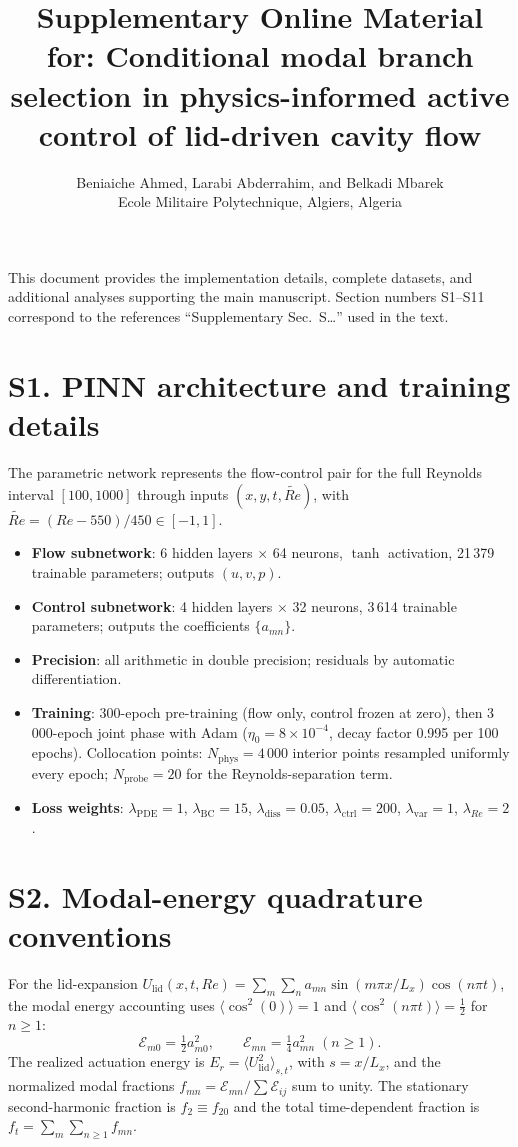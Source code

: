 \documentclass[11pt]{article}
\title{\textbf{Supplementary Online Material} for: Conditional modal branch
selection in physics-informed active control of lid-driven cavity flow}
\author{Beniaiche Ahmed, Larabi Abderrahim, and Belkadi Mbarek\\
Ecole Militaire Polytechnique, Algiers, Algeria}
\date{}
\begin{document}
\maketitle

\vspace{0.5em}
This document provides the implementation details, complete datasets, and
additional analyses supporting the main manuscript. Section numbers S1--S11
correspond to the references ``Supplementary Sec.~S\ldots'' used in the text.

\section{S1. PINN architecture and training details}
\label{sec:S1}

The parametric network represents the flow-control pair for the full Reynolds
interval $[100,1000]$ through inputs $(x,y,t,\widetilde{Re})$, with
$\widetilde{Re}=(Re-550)/450\in[-1,1]$.

\begin{itemize}
\item \textbf{Flow subnetwork}: 6 hidden layers $\times$ 64 neurons, $\tanh$
  activation, 21\,379 trainable parameters; outputs $(u,v,p)$.
\item \textbf{Control subnetwork}: 4 hidden layers $\times$ 32 neurons,
  3\,614 trainable parameters; outputs the coefficients $\{a_{mn}\}$.
\item \textbf{Precision}: all arithmetic in double precision; residuals by
  automatic differentiation.
\item \textbf{Training}: 300-epoch pre-training (flow only, control frozen at
  zero), then 3\,000-epoch joint phase with Adam
  ($\eta_0=8\times10^{-4}$, decay factor 0.995 per 100 epochs).
  Collocation points: $N_{\mathrm{phys}}=4\,000$ interior points resampled
  uniformly every epoch; $N_{\mathrm{probe}}=20$ for the Reynolds-separation
  term.
\item \textbf{Loss weights}:
  $\lambda_{\mathrm{PDE}}=1$, $\lambda_{\mathrm{BC}}=15$,
  $\lambda_{\mathrm{diss}}=0.05$, $\lambda_{\mathrm{ctrl}}=200$,
  $\lambda_{\mathrm{var}}=1$, $\lambda_{Re}=2$.
\end{itemize}

\section{S2. Modal-energy quadrature conventions}
\label{sec:S2}

For the lid-expansion
$U_{\mathrm{lid}}(x,t,Re)=\sum_m\sum_n a_{mn}\sin(m\pi x/L_x)\cos(n\pi t)$,
the modal energy accounting uses $\langle\cos^2(0)\rangle=1$ and
$\langle\cos^2(n\pi t)\rangle=\tfrac12$ for $n\ge1$:
\[
\mathcal{E}_{m0}=\tfrac12 a_{m0}^2,\qquad
\mathcal{E}_{mn}=\tfrac14 a_{mn}^2\;(n\ge1).
\]
The realized actuation energy is
$E_r=\langle U_{\mathrm{lid}}^2\rangle_{s,t}$, with
$s=x/L_x$, and the normalized modal fractions
$f_{mn}=\mathcal{E}_{mn}/\sum\mathcal{E}_{ij}$ sum to unity. The stationary
second-harmonic fraction is $f_2\equiv f_{20}$ and the total
time-dependent fraction is $f_t=\sum_{m}\sum_{n\ge1}f_{mn}$.
\end{document}
